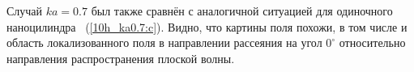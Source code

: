Случай $ka = 0.7$ был также сравнён с аналогичной ситуацией для одиночного наноцилиндра~\cite{andreev_lecz} (\autoref{10h_ka0.7:c}). Видно, что картины поля похожи, в том числе и область локализованного поля в направлении рассеяния на угол $0^{\circ}$ относительно направления распространения плоской волны.